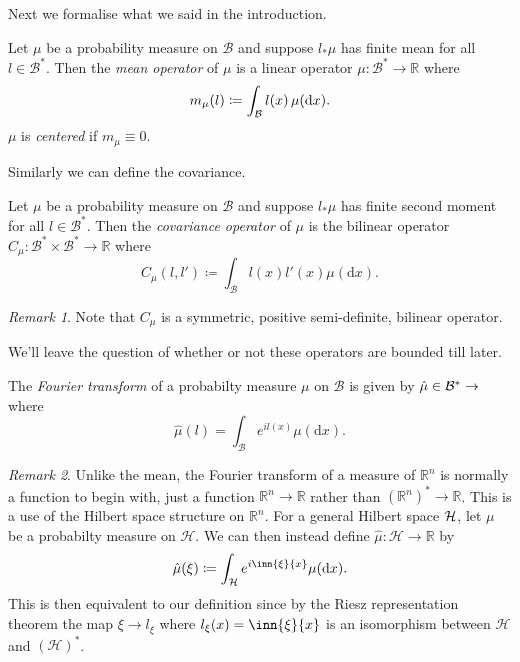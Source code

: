 \documentclass[fontsize=12pt, DIV=10]{scrreprt}
\theoremstyle{remark}
\newtheorem{remark}{Remark}
\newcommand{\defeq}{\coloneqq}
\let\C\relax
\newcommand{\R}{\mathbb R}
\newcommand{\C}{\mathbb C}
\newcommand{\calB}{\mathcal B}
\newcommand{\calH}{\mathcal H}
\newcommand{\dif}[1]{\text{d} #1}
\begin{document}
Next we formalise what we said in the introduction.

\begin{defn}
	Let $\mu$ be a probability measure on $\calB$ and suppose $l_* \mu$ has finite mean for all $l \in \calB^*$. Then the \emph{mean operator} of $\mu$ is a linear operator $\mu: \calB^* \to \R$ where
	\begin{equation}
		m_{\mu}(l) \defeq \int_{\cal B} l(x) \, \mu(\dif x).
	\end{equation}
	$\mu$ is \emph{centered} if $m_{\mu} \equiv 0$.
\end{defn}

Similarly we can define the covariance.

\begin{defn}
	Let $\mu$ be a probability measure on $\calB$ and suppose $l_* \mu$ has finite second moment for all $l \in \calB^*$. Then the \emph{covariance operator} of $\mu$ is the bilinear operator $C_{\mu} : \calB^* \times \calB^* \to \R$ where
	\begin{equation}
		C_{\mu}(l, l') \defeq \int_{\calB} l(x) l'(x) \mu(\dif x).
	\end{equation}
\end{defn}
\begin{remark}
	Note that $C_{\mu}$ is a symmetric, positive semi-definite, bilinear operator.
\end{remark}

We'll leave the question of whether or not these operators are bounded till later.

\begin{defn}
	The \emph{Fourier transform} of a probabilty measure $\mu$ on $\calB$ is given by $\hat{\mu} \in \calB^* \to \C$ where
	\begin{equation}
		\hat{\mu}(l) = \int_{\calB} e^{i l(x)} \mu(\dif x).
	\end{equation}
\end{defn}
\begin{remark}
	Unlike the mean, the Fourier transform of a measure of $\R^n$ is normally a function to begin with, just a function $\R^n \to \R$ rather than $(\R^n)^* \to \R$. This is a use of the Hilbert space structure on $\R^n$. For a general Hilbert space $\cal H$, let $\mu$ be a probabilty measure on $\calH$. We can then instead define $\hat{\mu}: \calH \to \R$ by
	\begin{equation}
		\hat{\mu}(\xi) \defeq \int_{\calH} e^{i \inn{\xi}{x}} \mu(\dif x).
	\end{equation}
	This is then equivalent to our definition since by the Riesz representation theorem the map $\xi \to l_{\xi}$ where $l_{\xi}(x) = \inn{\xi}{x}$ is an isomorphism between $\calH$ and $(\calH)^*$.
\end{remark}
\end{document}
